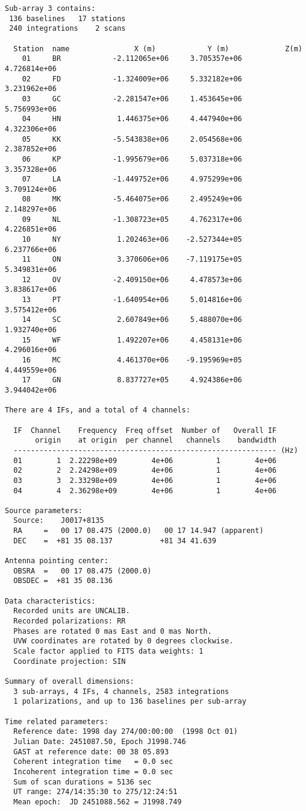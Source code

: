 \documentclass[a4paper,11pt]{article}
\begin{document}
\begin{lstlisting}
Sub-array 3 contains:
 136 baselines   17 stations
 240 integrations    2 scans

  Station  name               X (m)            Y (m)             Z(m)
    01     BR            -2.112065e+06     3.705357e+06     4.726814e+06
    02     FD            -1.324009e+06     5.332182e+06     3.231962e+06
    03     GC            -2.281547e+06     1.453645e+06     5.756993e+06
    04     HN             1.446375e+06     4.447940e+06     4.322306e+06
    05     KK            -5.543838e+06     2.054568e+06     2.387852e+06
    06     KP            -1.995679e+06     5.037318e+06     3.357328e+06
    07     LA            -1.449752e+06     4.975299e+06     3.709124e+06
    08     MK            -5.464075e+06     2.495249e+06     2.148297e+06
    09     NL            -1.308723e+05     4.762317e+06     4.226851e+06
    10     NY             1.202463e+06    -2.527344e+05     6.237766e+06
    11     ON             3.370606e+06    -7.119175e+05     5.349831e+06
    12     OV            -2.409150e+06     4.478573e+06     3.838617e+06
    13     PT            -1.640954e+06     5.014816e+06     3.575412e+06
    14     SC             2.607849e+06     5.488070e+06     1.932740e+06
    15     WF             1.492207e+06     4.458131e+06     4.296016e+06
    16     MC             4.461370e+06    -9.195969e+05     4.449559e+06
    17     GN             8.837727e+05     4.924386e+06     3.944042e+06

There are 4 IFs, and a total of 4 channels:

  IF  Channel    Frequency  Freq offset  Number of   Overall IF
       origin    at origin  per channel   channels    bandwidth
  ------------------------------------------------------------- (Hz)
  01        1  2.22298e+09        4e+06          1        4e+06
  02        2  2.24298e+09        4e+06          1        4e+06
  03        3  2.33298e+09        4e+06          1        4e+06
  04        4  2.36298e+09        4e+06          1        4e+06

Source parameters:
  Source: 	 J0017+8135
  RA     = 	 00 17 08.475 (2000.0)	 00 17 14.947 (apparent)
  DEC    = 	+81 35 08.137        	+81 34 41.639

Antenna pointing center:
  OBSRA  = 	 00 17 08.475 (2000.0)
  OBSDEC = 	+81 35 08.136

Data characteristics:
  Recorded units are UNCALIB.
  Recorded polarizations: RR
  Phases are rotated 0 mas East and 0 mas North.
  UVW coordinates are rotated by 0 degrees clockwise.
  Scale factor applied to FITS data weights: 1
  Coordinate projection: SIN

Summary of overall dimensions:
  3 sub-arrays, 4 IFs, 4 channels, 2583 integrations
  1 polarizations, and up to 136 baselines per sub-array

Time related parameters:
  Reference date: 1998 day 274/00:00:00  (1998 Oct 01)
  Julian Date: 2451087.50, Epoch J1998.746
  GAST at reference date: 00 38 05.893
  Coherent integration time   = 0.0 sec
  Incoherent integration time = 0.0 sec
  Sum of scan durations = 5136 sec
  UT range: 274/14:35:30 to 275/12:24:51
  Mean epoch:  JD 2451088.562 = J1998.749

\end{lstlisting}
\end{document}
